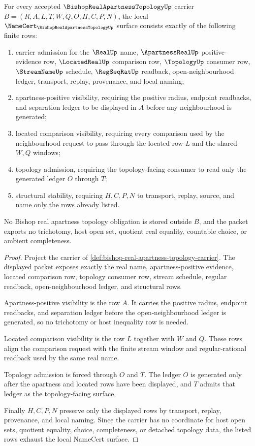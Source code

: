 \begin{theorem}
\label{thm:bishop-real-apartness-topology-namecert-obligations}
For every accepted $\BishopRealApartnessTopologyUp$ carrier $B=(R,A,L,T,W,Q,O,H,C,P,N)$, the local $\NameCert_{\BishopRealApartnessTopologyUp}$ surface consists exactly of the following finite rows:
\begin{enumerate}
\item carrier admission for the $\RealUp$ name, $\ApartnessRealUp$ positive-evidence row, $\LocatedRealUp$ comparison row, $\TopologyUp$ consumer row, $\StreamNameUp$ schedule, $\RegSeqRatUp$ readback, open-neighbourhood ledger, transport, replay, provenance, and local naming;
\item apartness-positive visibility, requiring the positive radius, endpoint readbacks, and separation ledger to be displayed in $A$ before any neighbourhood is generated;
\item located comparison visibility, requiring every comparison used by the neighbourhood request to pass through the located row $L$ and the shared $W,Q$ windows;
\item topology admission, requiring the topology-facing consumer to read only the generated ledger $O$ through $T$;
\item structural stability, requiring $H,C,P,N$ to transport, replay, source, and name only the rows already listed.
\end{enumerate}
No Bishop real apartness topology obligation is stored outside $B$, and the packet exports no trichotomy, host open set, quotient real equality, countable choice, or ambient completeness.
\end{theorem}
\begin{proof}
Project the carrier of \autoref{def:bishop-real-apartness-topology-carrier}. The displayed packet exposes exactly the real name, apartness-positive evidence, located comparison row, topology consumer row, stream schedule, regular readback, open-neighbourhood ledger, and structural rows.

Apartness-positive visibility is the row $A$. It carries the positive radius, endpoint readbacks, and separation ledger before the open-neighbourhood ledger is generated, so no trichotomy or host inequality row is needed.

Located comparison visibility is the row $L$ together with $W$ and $Q$. These rows align the comparison request with the finite stream window and regular-rational readback used by the same real name.

Topology admission is forced through $O$ and $T$. The ledger $O$ is generated only after the apartness and located rows have been displayed, and $T$ admits that ledger as the topology-facing surface.

Finally $H,C,P,N$ preserve only the displayed rows by transport, replay, provenance, and local naming. Since the carrier has no coordinate for host open sets, quotient equality, choice, completeness, or detached topology data, the listed rows exhaust the local NameCert surface.
\end{proof}

